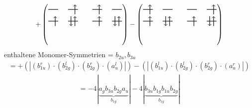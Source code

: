\documentclass{article}
\begin{document}
\vspace{0.5cm}
\[ +\left(\text{\begin{tikzpicture}
    \draw[thick] (0,0) -- (0.5,0); %
    \draw[thick] (1,0) -- (1.5,0); %
    \draw[thick] (0,-0.6) -- (0.5,-0.6); %
    \draw[thick] (1,-0.6) -- (1.5,-0.6); %
\draw[->, thick] (1.35, -0.25) -- (1.35, 0.25); 
\draw[-> , thick] (0.35, -0.85) -- (0.35, -0.35); 
 \draw[-> , thick] (1.35, -0.85) -- (1.35, -0.35); 
\draw[<- , thick] (1.15, -0.85) -- (1.15, -0.35); 
\end{tikzpicture}\qquad \begin{tikzpicture}
    \draw[thick] (0,0) -- (0.5,0); %
    \draw[thick] (1,0) -- (1.5,0); %
    \draw[thick] (0,-0.6) -- (0.5,-0.6); %
    \draw[thick] (1,-0.6) -- (1.5,-0.6); %
\draw[->, thick] (0.35, -0.25) -- (0.35, 0.25); 
\draw[-> , thick] (0.35, -0.85) -- (0.35, -0.35); 
 \draw[-> , thick] (1.35, -0.85) -- (1.35, -0.35); 
\draw[<- , thick] (1.15, -0.85) -- (1.15, -0.35); 
\end{tikzpicture}}\right)-\left(\text{\begin{tikzpicture}
    \draw[thick] (0,0) -- (0.5,0); %
    \draw[thick] (1,0) -- (1.5,0); %
    \draw[thick] (0,-0.6) -- (0.5,-0.6); %
    \draw[thick] (1,-0.6) -- (1.5,-0.6); %
\draw[->, thick] (0.35, -0.25) -- (0.35, 0.25); 
\draw[-> , thick] (0.35, -0.85) -- (0.35, -0.35); 
 \draw[-> , thick] (1.35, -0.85) -- (1.35, -0.35); 
\draw[<- , thick] (1.15, -0.85) -- (1.15, -0.35); 
\end{tikzpicture}\qquad \begin{tikzpicture}
    \draw[thick] (0,0) -- (0.5,0); %
    \draw[thick] (1,0) -- (1.5,0); %
    \draw[thick] (0,-0.6) -- (0.5,-0.6); %
    \draw[thick] (1,-0.6) -- (1.5,-0.6); %
\draw[->, thick] (1.35, -0.25) -- (1.35, 0.25); 
\draw[-> , thick] (0.35, -0.85) -- (0.35, -0.35); 
 \draw[-> , thick] (1.35, -0.85) -- (1.35, -0.35); 
\draw[<- , thick] (1.15, -0.85) -- (1.15, -0.35); 
\end{tikzpicture}}\right)\]enthaltene Monomer-Symmetrien = $b_{2u},b_{3u}$\begin{multline*}=+\left(\left|(b_{1u}^{r}) \cdot (b_{2g}^{l}) \cdot (b_{2g}^{r}) \cdot (a_{u}^{l})\right|\right)-\left(\left|(b_{1u}^{l}) \cdot (b_{2g}^{l}) \cdot (b_{2g}^{r}) \cdot (a_{u}^{r})\right|\right)\end{multline*}
\begin{multline*}
=-4\left|\underbrace{a_{g} b_{3u} b_{2g} a_{u}}_{b_{1g}}\right|-4\left|\underbrace{b_{3u} b_{1g} b_{1u} b_{2g}}_{b_{1g}}\right|
\end{multline*}
\\\\
\end{document}
